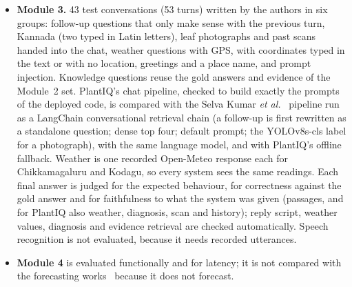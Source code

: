 \begin{itemize}
Generation compares three systems on the English questions with \emph{the same language model}, so that only the
retrieval-augmented pipeline differs: PlantIQ, the Selva Kumar pipeline with LangChain's default question-answering
prompt, and the model without retrieval. Because of free-tier API limits, all answers were generated by Claude Opus 5.5
from the exact prompts each system builds, without access to the gold answers, and then scored per answer against the
gold answer and the passages that system retrieved: faithfulness (supported claims over all factual claims), correctness
and relevance (0, 0.5 or 1). As a judge-free check, PlantIQ's dose audit is applied to every answer. PlantIQ's language
router, which rewrites a Kannada question as one English question, was run on the same model.
\item \textbf{Module 3.} 43 test conversations (53 turns) written by the authors in six groups: follow-up questions
that only make sense with the previous turn, Kannada (two typed in Latin letters), leaf photographs and past scans
handed into the chat, weather questions with GPS, with coordinates typed in the text or with no location, greetings
and a place name, and prompt injection. Knowledge questions reuse the gold answers and evidence of the Module~2 set.
PlantIQ's chat pipeline, checked to build exactly the prompts of the deployed code, is compared with the Selva
Kumar \textit{et al.}~\cite{selvakumar2024rag} pipeline run as a LangChain conversational retrieval chain (a follow-up
is first rewritten as a standalone question; dense top four; default prompt; the YOLOv8s-cls label for a photograph),
with the same language model, and with PlantIQ's offline fallback. Weather is one recorded Open-Meteo response each for
Chikkamagaluru and Kodagu, so every system sees the same readings. Each final answer is judged for the expected
behaviour, for correctness against the gold answer and for faithfulness to what the system was given (passages, and
for PlantIQ also weather, diagnosis, scan and history); reply script, weather values, diagnosis and evidence retrieval
are checked automatically. Speech recognition is not evaluated, because it needs recorded utterances.
\item \textbf{Module 4} is evaluated functionally and for latency; it is not compared with the forecasting
works~\cite{santhosha2023yield, xavier2023price} because it does not forecast.
\end{itemize}

